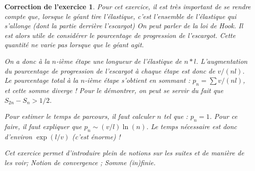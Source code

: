 \documentclass[12pt]{article}
\theoremstyle{break}
\newtheorem{cor}{Correction de l'exercice}
\begin{document}
\begin{cor}
Pour cet exercice, il est très important de se rendre compte que, lorsque le géant tire l'élastique, c'est l'ensemble de l'élastique qui s'allonge (dont la partie derrière l'escargot) \textit{On peut parler de la loi de Hook}. Il est alors utile de considérer le pourcentage de progression de l'escargot. Cette quantité ne varie pas lorsque que le géant agit.

On a donc à la $n$-ième étape une longueur de l'élastique de $n*l$. L'augmentation du pourcentage de progression de l'escargot à chaque étape est donc de $v/(nl)$. Le pourcentage total à la $n$-ième étape s'obtient en sommant : $p_n = \sum v/(nl)$, et cette somme diverge ! \textit{Pour le démontrer, on peut se servir du fait que $S_{2n} - S_n > 1/2$.}

Pour estimer le temps de parcours, il faut calculer $n$ tel que : $p_n = 1$. Pour ce faire, il faut expliquer que $p_n \sim (v/l) \ln(n)$. Le temps nécessaire est donc d'environ $\exp(l/v)$ (c'est énorme) !\newline


\textit{Cet exercice permet d'introduire plein de notions sur les suites et de manière de les voir; Notion de convergence ; Somme (in)finie.}
\end{cor}
\end{document}

